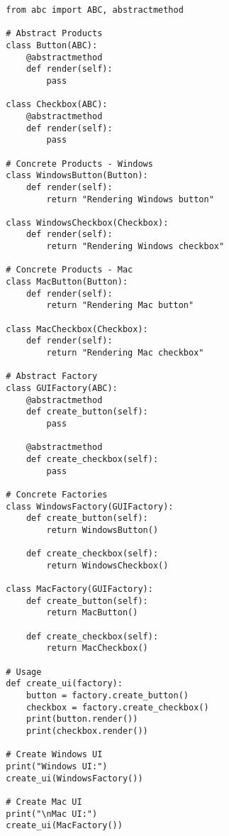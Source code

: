     \begin{example}
      \begin{lstlisting}
        from abc import ABC, abstractmethod

        # Abstract Products
        class Button(ABC):
            @abstractmethod
            def render(self):
                pass

        class Checkbox(ABC):
            @abstractmethod
            def render(self):
                pass

        # Concrete Products - Windows
        class WindowsButton(Button):
            def render(self):
                return "Rendering Windows button"

        class WindowsCheckbox(Checkbox):
            def render(self):
                return "Rendering Windows checkbox"

        # Concrete Products - Mac
        class MacButton(Button):
            def render(self):
                return "Rendering Mac button"

        class MacCheckbox(Checkbox):
            def render(self):
                return "Rendering Mac checkbox"

        # Abstract Factory
        class GUIFactory(ABC):
            @abstractmethod
            def create_button(self):
                pass
            
            @abstractmethod
            def create_checkbox(self):
                pass

        # Concrete Factories
        class WindowsFactory(GUIFactory):
            def create_button(self):
                return WindowsButton()
            
            def create_checkbox(self):
                return WindowsCheckbox()

        class MacFactory(GUIFactory):
            def create_button(self):
                return MacButton()
            
            def create_checkbox(self):
                return MacCheckbox()

        # Usage
        def create_ui(factory):
            button = factory.create_button()
            checkbox = factory.create_checkbox()
            print(button.render())
            print(checkbox.render())

        # Create Windows UI
        print("Windows UI:")
        create_ui(WindowsFactory())

        # Create Mac UI
        print("\nMac UI:")
        create_ui(MacFactory()) 
      \end{lstlisting}
    \end{example}

